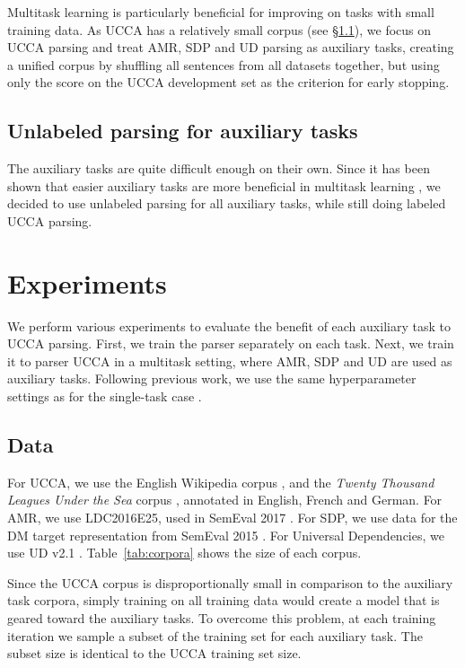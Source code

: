 \documentclass[11pt,a4paper]{article}
\begin{document}
Multitask learning is particularly beneficial for improving on tasks with small training data.
As UCCA has a relatively small corpus (see \S\ref{sec:data}),
we focus on UCCA parsing and treat AMR, SDP and UD parsing
as auxiliary tasks, creating a unified corpus by shuffling all sentences from all datasets together,
but using only the score on the UCCA development set as the criterion for early stopping.

\subsection{Unlabeled parsing for auxiliary tasks}\label{sec:unlabeled_aux}

The auxiliary tasks are quite difficult enough on their own.
Since it has been shown that easier auxiliary tasks are more beneficial
in multitask learning \cite{E17-2026},
we decided to use unlabeled parsing for all auxiliary tasks, while still doing
labeled UCCA parsing.


\section{Experiments}\label{sec:experiments}

We perform various experiments to evaluate the benefit of each auxiliary task to UCCA parsing.
First, we train the parser separately on each task.
Next, we train it to parser UCCA in a multitask setting, where AMR, SDP and UD are used as
auxiliary tasks. Following previous work, we use the same hyperparameter settings
as for the single-task case \cite{N16-1179,P16-2038,C16-1013,C16-1059,C16-1179,E17-1005}.

\subsection{Data}\label{sec:data}

For UCCA, we use the English Wikipedia corpus \cite{abend2013universal},
and the \textit{Twenty Thousand Leagues Under the Sea} corpus \cite[20K leagues;][]{sulem2015conceptual},
annotated in English, French and German.
For AMR, we use LDC2016E25, used in SemEval 2017 \cite{may2017semeval}.
For SDP, we use data for the DM target representation from SemEval 2015 \cite{oepen2015semeval}.
For Universal Dependencies, we use UD v2.1 \cite{11234/1-2515}.
Table~\ref{tab:corpora} shows the size of each corpus.

Since the UCCA corpus is disproportionally small in comparison to the auxiliary task corpora,
simply training on all training data would create a model that is geared toward the auxiliary tasks.
To overcome this problem,
at each training iteration we sample a subset of the training set for each auxiliary task.
The subset size is identical to the UCCA training set size.
\end{document}

